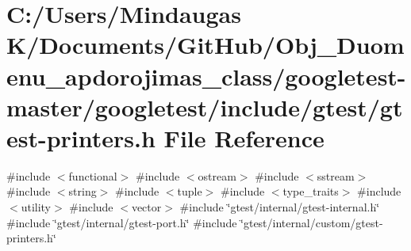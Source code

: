 \hypertarget{googletest-master_2googletest_2include_2gtest_2gtest-printers_8h}{}\section{C\+:/\+Users/\+Mindaugas K/\+Documents/\+Git\+Hub/\+Obj\+\_\+\+Duomenu\+\_\+apdorojimas\+\_\+class/googletest-\/master/googletest/include/gtest/gtest-\/printers.h File Reference}
\label{googletest-master_2googletest_2include_2gtest_2gtest-printers_8h}
{\ttfamily \#include $<$functional$>$}\newline
{\ttfamily \#include $<$ostream$>$}\newline
{\ttfamily \#include $<$sstream$>$}\newline
{\ttfamily \#include $<$string$>$}\newline
{\ttfamily \#include $<$tuple$>$}\newline
{\ttfamily \#include $<$type\+\_\+traits$>$}\newline
{\ttfamily \#include $<$utility$>$}\newline
{\ttfamily \#include $<$vector$>$}\newline
{\ttfamily \#include \char`\"{}gtest/internal/gtest-\/internal.\+h\char`\"{}}\newline
{\ttfamily \#include \char`\"{}gtest/internal/gtest-\/port.\+h\char`\"{}}\newline
{\ttfamily \#include \char`\"{}gtest/internal/custom/gtest-\/printers.\+h\char`\"{}}\newline
